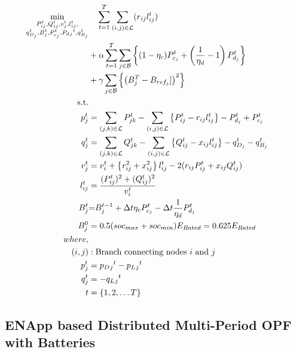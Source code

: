 \documentclass{article}
\begin{document}
\begin{gather}
	\begin{align}
		\min_{
		\substack{
		P_{ij}^t, Q_{ij}^t, v_{j}^t, l_{ij}^t, \\
		q_{D_j}^t, B_{j}^{t}, P_{c_j}^t, P_d{_j}^t, q_{B_j}^t}
		} 
		\vspace{-15ex} %
		& \quad
		\sum_{t = 1}^{T} \sum_{(i, j) \in \mathcal{L}} (r_{ij}l_{ij}^t) \\
		&+ \alpha \sum_{t = 1}^{T} \sum_{j \in \mathcal{B}} \left\{ (1- \eta_c)P_{c_j}^t + \left(\frac{1}{\eta_d}-1\right) P_{d_j}^t \right\} \\
		&+ \gamma \sum_{j \in \mathcal{B}} \left\{ \left(B^{T}_{j} - B_{ref_{j}}]\right)^2\right\} \\
		\text{s.t.} & {}\nonumber \\
		{p_j^t} & = {\sum_{(j, k) \in \mathcal{L}} P_{jk}^t - \sum_{(i, j) \in \mathcal{L}}\left\{P_{ij}^t - r_{ij}l_{ij}^t\right\} - P_{d_j}^t + P_{c_j}^t} && \\
		{q_j^t} & = {\sum_{(j, k) \in \mathcal{L}} Q_{jk}^t - \sum_{(i, j) \in \mathcal{L}}\left\{Q_{ij}^t - x_{ij}l_{ij}^t\right\} - q_{D_j}^t - q_{B_j}^t} && \\
		{v_j^t} & = {v_{i}^t +  \left\{r_{ij}^2 + x_{ij}^2\right\}l_{ij}^t - 2(r_{ij}P_{ij}^t + x_{ij}Q_{ij}^t)} && \\
		{l_{ij}^t} & = {\frac{(P_{ij}^{t})^2 + (Q_{ij}^{t})^2}{v_i^t}} \\
		{\color{darkgreen}{ B_{j}^{t} }} &\color{darkgreen}{=} { \color{darkgreen}{ B_{j}^{t-1} + \Delta t  \eta_c P_{c_j}^t - \Delta t\frac{1}{\eta_d} P_{d_j}^t } } \\
		{ B_{j}^{0} } &= { 0.5(soc_{max}+soc_{min})E_{Rated} = 0.625E_{Rated}} \\
		{where,} & {} \\
		{(i, j)} &: {\text{Branch connecting nodes $i$ and $j$}} \\
		{p_j^t} &= {p_D{_j}^t - p_L{_j}^t} \\
		{q_j^t} &= {-q_L{_j}^t} \\
		{t} &= {\{1, 2, \ldots T\}}
	\end{align}
\end{gather}

\subsection{ENApp based Distributed Multi-Period OPF with Batteries}
\end{document}
